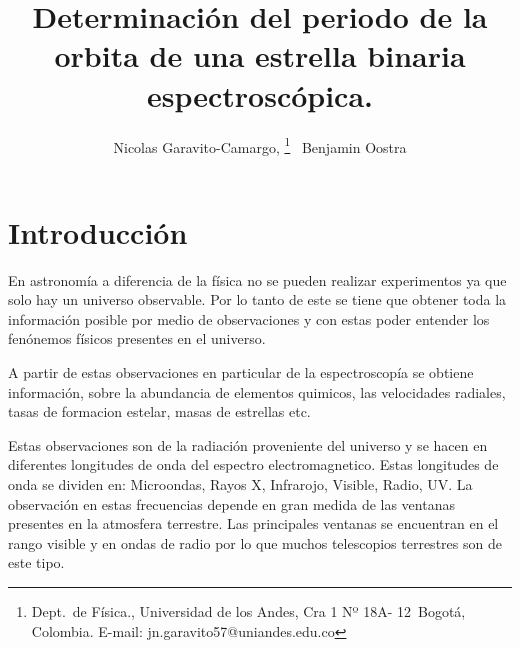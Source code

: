 \documentclass[Proceedings]{ascelike}
\begin{document}
%
\title{Determinaci\'on del periodo de la orbita de una estrella binaria espectrosc\'opica.}
%
\author{
Nicolas Garavito-Camargo,%
%
\thanks{
Dept.\ de F\'isica.,
Universidad de los Andes, 
Cra 1 Nº 18A- 12\ Bogot\'a, Colombia. E-mail: jn.garavito57@uniandes.edu.co}
\ Benjamin Oostra\footnotemark[1]
%
%
%
%
%
%
}
%
\maketitle
%

\section*{Introducci\'on}

En astronom\'ia a diferencia de la f\'isica no se pueden realizar experimentos ya
que solo hay un universo observable. Por lo tanto de este se tiene que obtener 
toda la informaci\'on posible por medio de observaciones y con estas poder entender 
los fen\'onemos f\'isicos presentes en el universo.

A partir de estas observaciones en particular de la espectroscop\'ia se obtiene informaci\'on,
sobre la abundancia de elementos quimicos, las velocidades radiales, tasas de formacion estelar, 
masas de estrellas etc.

Estas observaciones son de la radiaci\'on proveniente del universo y se hacen
 en diferentes longitudes de onda del espectro electromagnetico. Estas longitudes 
 de onda se dividen en: Microondas, Rayos X, Infrarojo, Visible, Radio, UV. La observaci\'on 
 en estas frecuencias depende en gran medida de las ventanas presentes en la atmosfera terrestre.
Las principales ventanas se encuentran en el rango visible y en ondas de radio por lo que muchos telescopios terrestres son de este tipo. 
\end{document}
